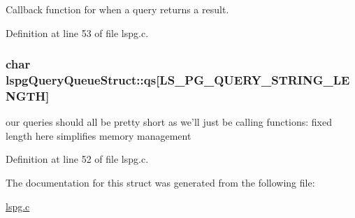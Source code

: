 Callback function for when a query returns a result. 



Definition at line 53 of file lspg.\-c.

\hypertarget{structlspgQueryQueueStruct_abf8c9c581b38a5e3e269eda69e47de15}{
\subsubsection[{qs}]{\setlength{\rightskip}{0pt plus 5cm}char lspg\-Query\-Queue\-Struct\-::qs\mbox{[}{\bf L\-S\-\_\-\-P\-G\-\_\-\-Q\-U\-E\-R\-Y\-\_\-\-S\-T\-R\-I\-N\-G\-\_\-\-L\-E\-N\-G\-T\-H}\mbox{]}}}\label{structlspgQueryQueueStruct_abf8c9c581b38a5e3e269eda69e47de15}


our queries should all be pretty short as we'll just be calling functions\-: fixed length here simplifies memory management 



Definition at line 52 of file lspg.\-c.



The documentation for this struct was generated from the following file\-:\begin{DoxyCompactItemize}
\item 
\hyperlink{lspg_8c}{lspg.\-c}\end{DoxyCompactItemize}
